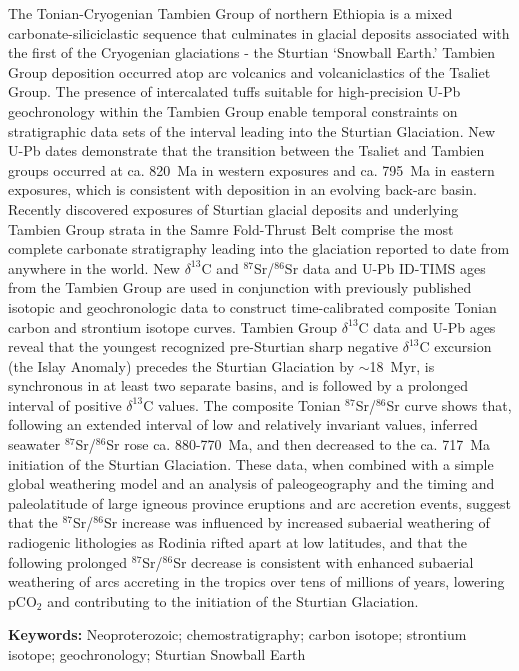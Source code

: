 \documentclass[11pt,letterpaper]{article}
\newcommand{\dC}{$\delta^{13}$C\xspace}
\newcommand{\SrSr}{$^{87}$Sr/$^{86}$Sr\xspace}
\begin{document}
The Tonian-Cryogenian Tambien Group of northern Ethiopia is a mixed carbonate-siliciclastic sequence that culminates in glacial deposits associated with the first of the Cryogenian glaciations - the Sturtian `Snowball Earth.' Tambien Group deposition occurred atop arc volcanics and volcaniclastics of the Tsaliet Group. The presence of intercalated tuffs suitable for high-precision U-Pb geochronology within the Tambien Group enable temporal constraints on stratigraphic data sets of the interval leading into the Sturtian Glaciation. New U-Pb dates demonstrate that the transition between the Tsaliet and Tambien groups occurred at ca. 820~Ma in western exposures and ca. 795~Ma in eastern exposures, which is consistent with deposition in an evolving back-arc basin. Recently discovered exposures of Sturtian glacial deposits and underlying Tambien Group strata in the Samre Fold-Thrust Belt comprise the most complete carbonate stratigraphy leading into the glaciation reported to date from anywhere in the world. New \dC and \SrSr data and U-Pb ID-TIMS ages from the Tambien Group are used in conjunction with previously published isotopic and geochronologic data to construct time-calibrated composite Tonian carbon and strontium isotope curves. Tambien Group \dC data and U-Pb ages reveal that the youngest recognized pre-Sturtian sharp negative \dC excursion (the Islay Anomaly) precedes the Sturtian Glaciation by $\sim$18~Myr, is synchronous in at least two separate basins, and is followed by a prolonged interval of positive \dC values. The composite Tonian \SrSr curve shows that, following an extended interval of low and relatively invariant values, inferred seawater \SrSr rose ca. 880-770~Ma, and then decreased to the ca. 717~Ma initiation of the Sturtian Glaciation. These data, when combined with a simple global weathering model and an analysis of paleogeography and the timing and paleolatitude of large igneous province eruptions and arc accretion events, suggest that the \SrSr increase was influenced by increased subaerial weathering of radiogenic lithologies as Rodinia rifted apart at low latitudes, and that the following prolonged \SrSr decrease is consistent with enhanced subaerial weathering of arcs accreting in the tropics over tens of millions of years, lowering pCO$_{2}$ and contributing to the initiation of the Sturtian Glaciation.

\noindent\textbf{Keywords:} Neoproterozoic; chemostratigraphy; carbon isotope; strontium isotope; geochronology; Sturtian Snowball Earth

\clearpage
\end{document}
